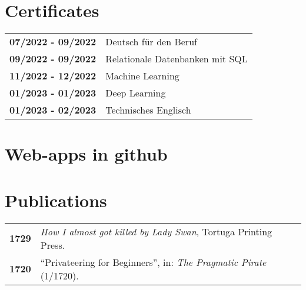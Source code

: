 \documentclass[grey]{hipstercv}
\begin{document}
\begin{paracol}{2}
\vspace{4em}

\begin{minipage}[t]{0.3\textwidth}
\section*{Certificates}
\begin{tabular}{>{\footnotesize\bfseries}r >{\footnotesize}p{}}
	07/2022 - 09/2022 & Deutsch für den Beruf \\
	09/2022 - 09/2022 & Relationale Datenbanken mit SQL\\
    11/2022 - 12/2022 & Machine Learning \\
    01/2023 - 01/2023 & Deep Learning \\
    01/2023 - 02/2023 & Technisches Englisch 
\end{tabular}
\vspace{4em}
\section*{ Web-apps in github }


\end{minipage}\hfill
\begin{minipage}[t]{0.3\textwidth}
\section*{Publications}
\begin{tabular}{>{\footnotesize\bfseries}r >{\footnotesize}p{}}
    1729 & \emph{How I almost got killed by Lady Swan}, Tortuga Printing Press. \\
    1720 & ``Privateering for Beginners'', in: \emph{The Pragmatic Pirate} (1/1720).
\end{tabular}

\end{minipage}
\end{paracol}
\end{document}
